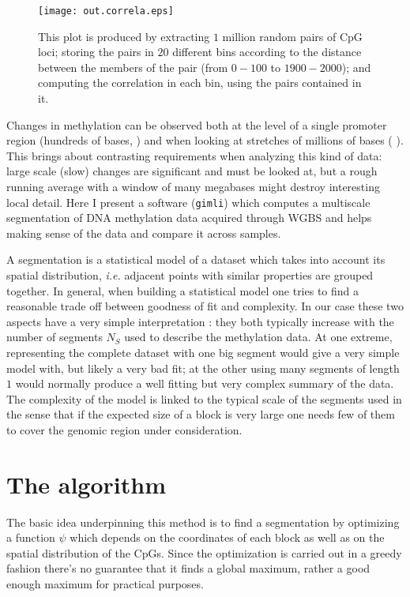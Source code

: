 \documentclass[12pt]{amsart}
\newcommand{\gimli}{\texttt{gimli}}
\newcommand{\ie}{\textit{i.e.}}
\begin{document}
\begin{center}
\begin{figure}\label{fig_corr}
\texttt{[image: out.correla.eps]}
\caption{This plot is produced by extracting $1$ million random pairs of CpG loci;
storing the pairs in $20$ different bins  according to the distance between the members
of the pair (from $0-100$ to $1900-2000$); and computing the correlation in each bin,
using the pairs contained in it.}
\end{figure}
\end{center}

 
Changes in methylation can be observed both at the level of a single promoter
region (hundreds of bases, \cite{methylseekr}) and when looking at stretches
of millions of bases (\cite{largeblocks} ).
This brings about contrasting requirements when analyzing this kind of data: large scale (slow) changes are 
significant and must be looked at, but a rough
running average with a window of many megabases might destroy interesting
local detail. Here I present  a software (\gimli{}) which computes a multiscale segmentation 
of DNA methylation 
data acquired through WGBS and helps making sense of the data and compare 
it across samples.

A segmentation is a statistical model of a dataset  which takes into account its spatial distribution,
\ie{} adjacent points with similar properties are grouped together.
In general, when building a statistical model one tries to find a reasonable 
trade off between goodness of fit and complexity.
In our case these two aspects have a very simple interpretation : they both typically 
increase with the number of segments $N_S$ used to describe the 
methylation data.  
At one extreme, representing the complete dataset with one big segment would 
give a very simple model with, but likely a very bad fit;  
at the other using many segments of length $1$ would normally produce
a well fitting but very complex summary of the data.
The complexity of the model is linked to the typical scale of the segments used
in the sense that if the expected size of a block is very large one needs few of them to 
cover the genomic region under consideration.

\section{The algorithm}
The basic idea underpinning this method is to find a segmentation
by optimizing  a function $\psi$ which depends on the coordinates
of each block as well as on the spatial distribution of the CpGs.
Since the optimization is carried out
in a greedy fashion there's no guarantee
that it finds a global maximum, rather a good enough maximum for practical
purposes.
\end{document}
